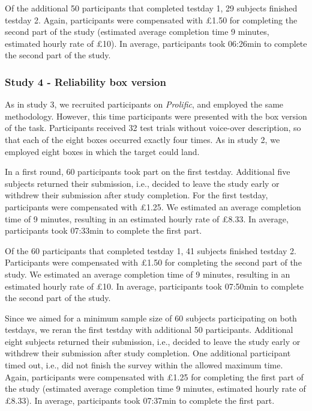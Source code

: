 \documentclass[
  english,
  man,floatsintext]{apa6}
\begin{document}
Of the additional 50 participants that completed testday 1, 29 subjects finished testday 2. Again, participants were compensated with £1.50 for completing the second part of the study (estimated average completion time 9 minutes, estimated hourly rate of £10). In average, participants took 06:26min to complete the second part of the study.

\hypertarget{study-4---reliability-box-version}{%
\subsubsection{Study 4 - Reliability box version}\label{study-4---reliability-box-version}}

As in study 3, we recruited participants on \emph{Prolific}, and employed the same methodology. However, this time participants were presented with the box version of the task. Participants received 32 test trials without voice-over description, so that each of the eight boxes occurred exactly four times. As in study 2, we employed eight boxes in which the target could land.

In a first round, 60 participants took part on the first testday. Additional five subjects returned their submission, i.e., decided to leave the study early or withdrew their submission after study completion. For the first testday, participants were compensated with £1.25. We estimated an average completion time of 9 minutes, resulting in an estimated hourly rate of £8.33. In average, participants took 07:33min to complete the first part.

Of the 60 participants that completed testday 1, 41 subjects finished testday 2. Participants were compensated with £1.50 for completing the second part of the study. We estimated an average completion time of 9 minutes, resulting in an estimated hourly rate of £10. In average, participants took 07:50min to complete the second part of the study.

Since we aimed for a minimum sample size of 60 subjects participating on both testdays, we reran the first testday with additional 50 participants. Additional eight subjects returned their submission, i.e., decided to leave the study early or withdrew their submission after study completion. One additional participant timed out, i.e., did not finish the survey within the allowed maximum time. Again, participants were compensated with £1.25 for completing the first part of the study (estimated average completion time 9 minutes, estimated hourly rate of £8.33). In average, participants took 07:37min to complete the first part.
\end{document}
